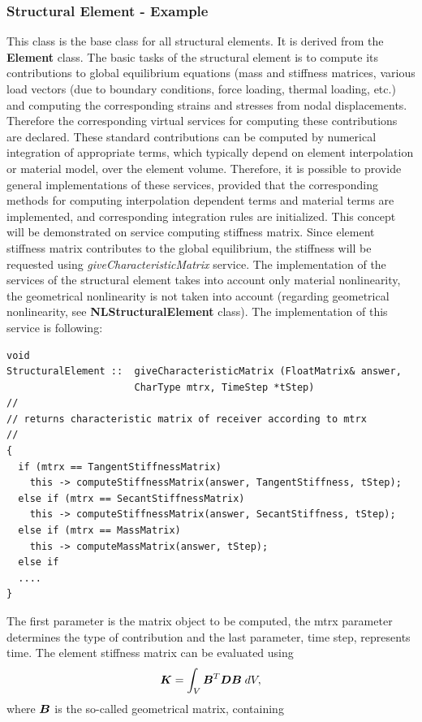 \documentclass[a4paper]{article}
\newcommand{\class}[1]{{\bf #1}}
\newcommand{\service}[1]{{\em #1}}
\newcommand{\mbf}[1]{\mbox{\boldmath$#1$}}
\begin{document}
\subsubsection{Structural Element -  Example}
This class is the base class for all structural elements.
It is derived from the \class{Element} class. 
The basic tasks of the structural element is to compute its contributions
to global equilibrium equations (mass and stiffness matrices, various
load vectors (due to boundary conditions, force loading, thermal
loading, etc.) and computing the corresponding strains and stresses
from nodal displacements. Therefore the corresponding virtual services
for computing these contributions are declared.
These standard contributions can be computed by numerical
integration  of appropriate terms, which typically depend on 
element interpolation or material model, over the element volume. Therefore, it is possible to
provide general implementations of these services, provided that the
corresponding methods for computing interpolation dependent terms and
material terms are implemented, and corresponding integration rules
are initialized. 
This concept will be demonstrated on service computing stiffness
matrix. Since element stiffness matrix contributes to the global
equilibrium, the stiffness will be requested using
\service{giveCharacteristicMatrix} service. 
The implementation of the services of the structural element takes
into account only material nonlinearity, the geometrical nonlinearity 
is not taken into account (regarding geometrical nonlinearity, see \class{NLStructuralElement} class).
The implementation of this
service is following:
\begin{verbatim}
void
StructuralElement ::  giveCharacteristicMatrix (FloatMatrix& answer, 
                      CharType mtrx, TimeStep *tStep) 
// 
// returns characteristic matrix of receiver according to mtrx
//
{
  if (mtrx == TangentStiffnessMatrix) 
    this -> computeStiffnessMatrix(answer, TangentStiffness, tStep);
  else if (mtrx == SecantStiffnessMatrix) 
    this -> computeStiffnessMatrix(answer, SecantStiffness, tStep);
  else if (mtrx == MassMatrix) 
    this -> computeMassMatrix(answer, tStep);
  else if 
  ....
}
\end{verbatim}
The first parameter is the matrix object to be computed, the mtrx
parameter determines the type of contribution and the last parameter, time step, represents time.
The element stiffness matrix can be evaluated using
$$
\mbf{K} = \int_{V} \mbf{B}^T\mbf{D}\mbf{B}\;dV,
$$
where $\mbf{B}$ is the so-called geometrical matrix, containing
\end{document}
